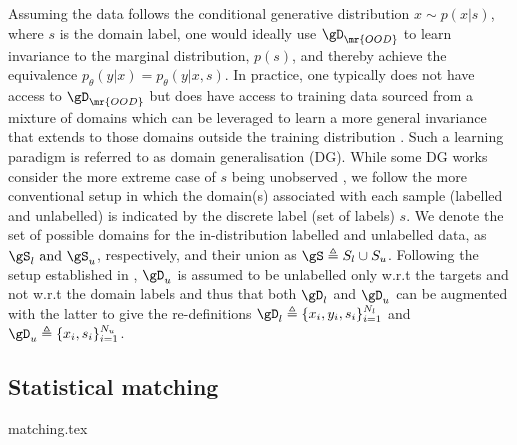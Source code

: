 Assuming the data follows the conditional generative distribution \( x \sim p(x | s) \), where
\(s\) is the domain label, one would ideally use \( \gD_{\mr{OOD}} \) to learn invariance to the
marginal distribution, \( p(s) \), and thereby achieve the equivalence \( p_\theta(y | x) =
p_\theta(y | x,
s) \).
%
In practice, one typically does not have access to \( \gD_{\mr{OOD}} \) but does have access to
training data sourced from a mixture of domains which can be leveraged to learn a more general
invariance that extends to those domains outside the training distribution
\cite{arjovsky2019invariant}.
%
Such a learning paradigm is referred to as domain generalisation (DG).
%
While some DG works consider the more extreme case of $s$ being unobserved
\citep{creager2021environment}, we follow the more conventional setup \citep{arjovsky2019invariant,
krueger2021out, SagWeiLeeGaoetal22} in which the domain(s) associated with each sample (labelled and
unlabelled) is indicated by the discrete label (set of labels) $s$. 
%
We denote the set of possible domains for the in-distribution labelled and unlabelled data, as \(
\gS_l$ and $\gS_u \), respectively, and their union as \( \gS \triangleq S_l \cup S_u \).
%
Following the setup established in \cite{SagWeiLeeGaoetal22}, \( \gD_u \) is assumed to be unlabelled
only w.r.t the targets and not w.r.t the domain labels and thus that both \( \gD_l \) and \( \gD_u
\) can be augmented with the latter to give the re-definitions \( \gD_l \triangleq \{ x_i, y_i, s_i
\}_{i=1}^{N_l} \) and \( \gD_u \triangleq \{x_i, s_i \}_{i=1}^{N_u} \).

\subsection{Statistical matching} 
{matching.tex}

